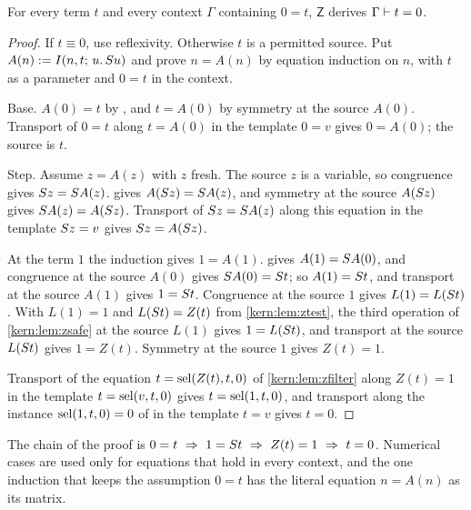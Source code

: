 \begin{lemma}
\label{kern:lem:zsym}
For every term $t$ and every context $\Gamma$ containing $0=t$, $\mathsf{Z}$
derives $\Gamma\vdash t=0$.
\end{lemma}

\begin{proof}
If $t\equiv 0$, use reflexivity.  Otherwise $t$ is a permitted source.  Put
$A(n)\mathrel{:=}I(n,t;\,u.\,S u)$ and prove $n=A(n)$ by equation induction on
$n$, with $t$ as a parameter and $0=t$ in the context.

Base.  $A(0)=t$ by , and $t=A(0)$ by symmetry at the source
$A(0)$.  Transport of $0=t$ along $t=A(0)$ in the template $0=v$ gives
$0=A(0)$; the source is $t$.

Step.  Assume $z=A(z)$ with $z$ fresh.  The source $z$ is a variable, so
congruence gives $S z=S A(z)$.   gives
$A(S z)=S A(z)$, and symmetry at the source $A(S z)$ gives
$S A(z)=A(S z)$.  Transport of $S z=S A(z)$ along this equation
in the template $S z=v$ gives $S z=A(S z)$.

At the term $1$ the induction gives $1=A(1)$.   gives
$A(1)=S A(0)$, and congruence at the source $A(0)$ gives
$S A(0)=S t$; so $A(1)=S t$, and transport at the source $A(1)$
gives $1=S t$.  Congruence at the source $1$ gives $L(1)=L(S t)$.  With
$L(1)=1$ and $L(S t)=Z(t)$ from \cref{kern:lem:ztest}, the third
operation of \cref{kern:lem:zsafe} at the source $L(1)$ gives $1=L(S t)$,
and transport at the source $L(S t)$ gives $1=Z(t)$.  Symmetry at the
source $1$ gives $Z(t)=1$.

Transport of the equation $t=\operatorname{sel}(Z(t),t,0)$ of \cref{kern:lem:zfilter}
along $Z(t)=1$ in the template $t=\operatorname{sel}(v,t,0)$ gives $t=\operatorname{sel}(1,t,0)$, and
transport along the instance $\operatorname{sel}(1,t,0)=0$ of  in the
template $t=v$ gives $t=0$.
\end{proof}

The chain of the proof is
$0=t\ \Rightarrow\ 1=\Suc t\ \Rightarrow\ Z(t)=1\ \Rightarrow\ t=0$.
Numerical cases are used only for equations that hold in every context, and
the one induction that keeps the assumption $0=t$ has the literal equation
$n=A(n)$ as its matrix.

